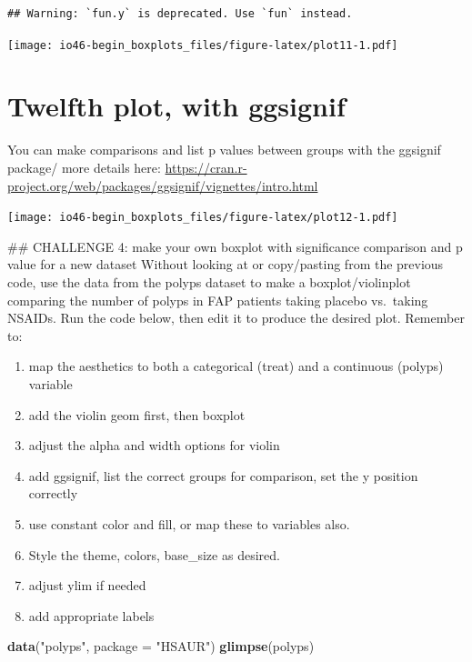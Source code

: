 \documentclass[
]{book}
\newenvironment{Shaded}{\begin{snugshade}}{\end{snugshade}}
\newcommand{\DataTypeTok}[1]{\textcolor[rgb]{0.13,0.29,0.53}{#1}}
\newcommand{\KeywordTok}[1]{\textcolor[rgb]{0.13,0.29,0.53}{\textbf{#1}}}
\newcommand{\NormalTok}[1]{#1}
\newcommand{\StringTok}[1]{\textcolor[rgb]{0.31,0.60,0.02}{#1}}
\providecommand{\tightlist}{%
  \setlength{\itemsep}{0pt}\setlength{\parskip}{0pt}}
\begin{document}
\begin{verbatim}
## Warning: `fun.y` is deprecated. Use `fun` instead.
\end{verbatim}

\texttt{[image: io46-begin\_boxplots\_files/figure-latex/plot11-1.pdf]}

\hypertarget{twelfth-plot-with-ggsignif}{%
\section{Twelfth plot, with ggsignif}\label{twelfth-plot-with-ggsignif}}

You can make comparisons and list p values between groups with the ggsignif package/
more details here:
\url{https://cran.r-project.org/web/packages/ggsignif/vignettes/intro.html}

\texttt{[image: io46-begin\_boxplots\_files/figure-latex/plot12-1.pdf]}

\#\# CHALLENGE 4: make your own boxplot with significance comparison and p value for a new dataset
Without looking at or copy/pasting from the previous code,
use the data from the polyps dataset to make a boxplot/violinplot comparing the number of polyps in FAP patients taking placebo vs.~taking NSAIDs.
Run the code below, then edit it to produce the desired plot.
Remember to:

\begin{enumerate}
\def\labelenumi{\arabic{enumi}.}
\tightlist
\item
  map the aesthetics to both a categorical (treat) and a continuous (polyps) variable
\item
  add the violin geom first, then boxplot
\item
  adjust the alpha and width options for violin
\item
  add ggsignif, list the correct groups for comparison, set the y position correctly
\item
  use constant color and fill, or map these to variables also.
\item
  Style the theme, colors, base\_size as desired.
\item
  adjust ylim if needed
\item
  add appropriate labels
\end{enumerate}

\begin{Shaded}
\begin{Highlighting}[]
\KeywordTok{data}\NormalTok{(}\StringTok{"polyps"}\NormalTok{, }\DataTypeTok{package =} \StringTok{"HSAUR"}\NormalTok{)}
\KeywordTok{glimpse}\NormalTok{(polyps)}
\end{Highlighting}
\end{Shaded}
\end{document}
